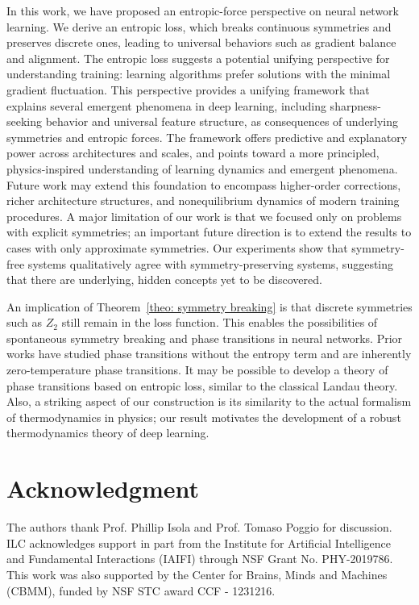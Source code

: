 \documentclass{article}
\theoremstyle{plain}
\begin{document}
In this work, we have proposed an entropic-force perspective on neural network learning. We derive an entropic loss, which breaks continuous symmetries and preserves discrete ones, leading to universal behaviors such as gradient balance and alignment. The entropic loss suggests a potential unifying perspective for understanding training: learning algorithms prefer solutions with the minimal gradient fluctuation. This perspective provides a unifying framework that explains several emergent phenomena in deep learning, including sharpness-seeking behavior and universal feature structure, as consequences of underlying symmetries and entropic forces. The framework offers predictive and explanatory power across architectures and scales, and points toward a more principled, physics-inspired understanding of learning dynamics and emergent phenomena. Future work may extend this foundation to encompass higher-order corrections, richer architecture structures, and nonequilibrium dynamics of modern training procedures. A major limitation of our work is that we focused only on problems with explicit symmetries; an important future direction is to extend the results to cases with only approximate symmetries. Our experiments show that symmetry-free systems qualitatively agree with symmetry-preserving systems, suggesting that there are underlying, hidden concepts yet to be discovered.

An implication of Theorem~\ref{theo: symmetry breaking} is that discrete symmetries such as $Z_2$ still remain in the loss function. This enables the possibilities of spontaneous symmetry breaking and phase transitions in neural networks. Prior works have studied phase transitions \cite{ziyin2024symmetry} without the entropy term and are inherently zero-temperature phase transitions. It may be possible to develop a theory of phase transitions based on entropic loss, similar to the classical Landau theory. Also, a striking aspect of our construction is its similarity to the actual formalism of thermodynamics in physics; our result motivates the development of a robust thermodynamics theory of deep learning.




\section*{Acknowledgment}
The authors thank Prof. Phillip Isola and Prof. Tomaso Poggio for discussion. ILC acknowledges support in part from the Institute for Artificial Intelligence and Fundamental Interactions (IAIFI) through NSF Grant No. PHY-2019786. This work was also supported by the Center for Brains, Minds and Machines (CBMM), funded by NSF STC award  CCF - 1231216.
\end{document}
